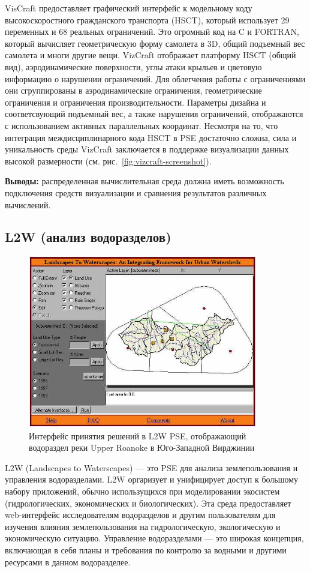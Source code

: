 VisCraft предоставляет графический интерфейс к модельному коду высокоскоростного гражданского транспорта (HSCT), который использует 29 переменных и 68 реальных ограничений. Это огромный код на C и FORTRAN, который вычисляет геометрическую форму самолета в 3D, общий подъемный вес самолета и многи другие вещи. VizCraft отображает платформу HSCT (общий вид), аэродинамические поверхности, углы атаки крыльев и цветовую информацию о нарушении ограничений. Для облегчения работы с ограничениями они сгруппированы в аэродинамические ограничения, геометрические ограничения и ограничения производительности. Параметры дизайна и соответсвующий подъемный вес, а также нарушения ограничений, отображаются с использованием активных параллельных координат. Несмотря на то, что интеграция междисциплинарного кода HSCT в PSE достаточно сложна, сила и уникальность среды VizCraft заключается в поддержке визуализации данных высокой размерности (см. рис.~\ref{fig:vizcraft-screenshot}).

\textbf{Выводы:} распределенная вычислительная среда должна иметь возможность подключения средств визуализации и сравнения результатов различных вычислений.  

\subsection{L2W (анализ водоразделов)}
\begin{figure}
  \centering
    \includegraphics[width=10cm]{images/l2w-screenshot.png}
  \caption{Интерфейс принятия решений в L2W PSE, отображающий водораздел реки Upper Roanoke в Юго-Западной Вирджинии}
  \label{fig:l2w-screenshot}
\end{figure}

L2W (Landscapes to Waterscapes) --- это PSE для анализа землепользования и управления водоразделами. L2W оргаризует и унифицирует доступ к большому набору приложений, обычно использущихся при моделировании экосистем (гидрологических, экономических и биологических). Эта среда предоставляет web-интерфейс исследователям водоразделов и другим пользователям для изучения влияния землепользования на гидрологическую, экологическую и экономическую ситуацию. Управление водоразделами --- это широкая концепция, включающая в себя планы и требования по контролю за водными и другими ресурсами в данном водоразделее.

